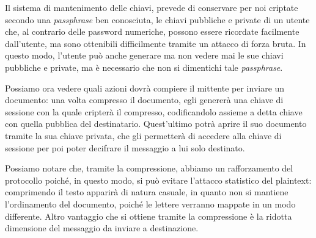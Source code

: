 Il sistema di mantenimento delle chiavi, prevede di conservare per noi criptate
secondo una \textit{passphrase} ben conosciuta, le chiavi pubbliche e private di
un utente che, al contrario delle password numeriche, possono essere ricordate
facilmente dall'utente, ma sono ottenibili difficilmente tramite un attacco di
forza bruta. In questo modo, l'utente può anche generare ma non vedere mai le
sue chiavi pubbliche e private, ma è necessario che non si dimentichi tale
\textit{passphrase}.
\medskip

Possiamo ora vedere quali azioni dovrà compiere il mittente per inviare un 
documento: una volta compresso il documento, egli genererà una chiave di 
sessione con la quale cripterà il compresso, codificandolo assieme a detta chiave 
con quella pubblica del destinatario. Quest'ultimo potrà aprire il suo documento
tramite la sua chiave privata, che gli permetterà di accedere alla chiave di 
sessione per poi poter decifrare il messaggio a lui solo destinato.

Possiamo notare che, tramite la compressione, abbiamo un rafforzamento del 
protocollo poiché, in questo modo, si può evitare l'attacco statistico del
plaintext: comprimendo il testo apparirà di natura casuale, in quanto 
non si mantiene l'ordinamento del documento, poiché le lettere verranno 
mappate in un modo differente. Altro vantaggio che si ottiene tramite la 
compressione è la ridotta dimensione del messaggio da inviare a destinazione.

